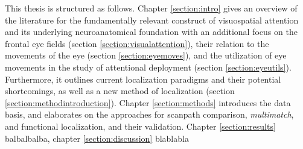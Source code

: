 \documentclass[a4paper, 12pt]{scrreprt}
\begin{document}
This thesis is structured as follows. Chapter \ref{section:intro} gives an overview of the literature for the fundamentally relevant construct of visuospatial attention and its underlying neuroanatomical foundation with an additional focus on the frontal eye fields  (section \ref{section:visualattention}), their relation to the movements of the eye (section \ref{section:eyemoves}), and the utilization of eye movements in the study of attentional deployment (section \ref{section:eyeutils}). Furthermore, it outlines current localization paradigms and their potential shortcomings, as well as a new method of localization (section \ref{section:methodintroduction}). Chapter \ref{section:methods} introduces the data basis, and elaborates on the approaches for scanpath comparison, \textit{multimatch}, and functional localization, and their validation. Chapter \ref{section:results} balbalbalba, chapter \ref{section:discussion} blablabla
\pagebreak
\end{document}

